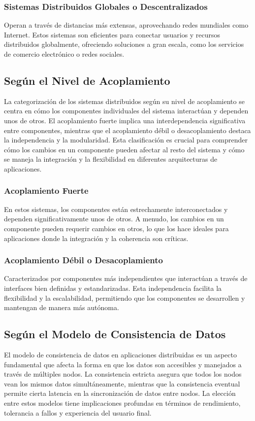 \subsubsection{Sistemas Distribuidos Globales o Descentralizados}
Operan a través de distancias más extensas, aprovechando redes mundiales como Internet. Estos sistemas son eficientes para conectar usuarios y recursos distribuidos globalmente, ofreciendo soluciones a gran escala, como los servicios de comercio electrónico o redes sociales.

\subsection{Según el Nivel de Acoplamiento}
La categorización de los sistemas distribuidos según su nivel de acoplamiento se centra en cómo los componentes individuales del sistema interactúan y dependen unos de otros. El acoplamiento fuerte implica una interdependencia significativa entre componentes, mientras que el acoplamiento débil o desacoplamiento destaca la independencia y la modularidad. Esta clasificación es crucial para comprender cómo los cambios en un componente pueden afectar al resto del sistema y cómo se maneja la integración y la flexibilidad en diferentes arquitecturas de aplicaciones.

\subsubsection{Acoplamiento Fuerte}
En estos sistemas, los componentes están estrechamente interconectados y dependen significativamente unos de otros. A menudo, los cambios en un componente pueden requerir cambios en otros, lo que los hace ideales para aplicaciones donde la integración y la coherencia son críticas.

\subsubsection{Acoplamiento Débil o Desacoplamiento}
Caracterizados por componentes más independientes que interactúan a través de interfaces bien definidas y estandarizadas. Esta independencia facilita la flexibilidad y la escalabilidad, permitiendo que los componentes se desarrollen y mantengan de manera más autónoma.

\subsection{Según el Modelo de Consistencia de Datos}
El modelo de consistencia de datos en aplicaciones distribuidas es un aspecto fundamental que afecta la forma en que los datos son accesibles y manejados a través de múltiples nodos. La consistencia estricta asegura que todos los nodos vean los mismos datos simultáneamente, mientras que la consistencia eventual permite cierta latencia en la sincronización de datos entre nodos. La elección entre estos modelos tiene implicaciones profundas en términos de rendimiento, tolerancia a fallos y experiencia del usuario final.

